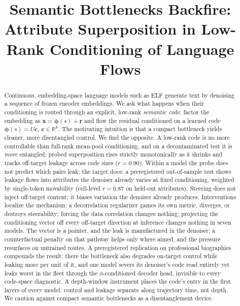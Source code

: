 \documentclass[11pt]{article}
\title{\vspace{-3em}Semantic Bottlenecks Backfire:\\
Attribute Superposition in Low-Rank Conditioning of Language Flows}
\author{}
\date{}
\newcommand{\R}{\mathbb{R}}
\newcommand{\xb}{\bm{x}}
\newcommand{\rb}{\bm{r}}
\newcommand{\phib}{\bm{\phi}}
\newcommand{\cb}{\bm{c}}
\begin{document}
\maketitle
\vspace{-3em}

\begin{abstract}
Continuous, embedding-space language models such as ELF generate text by denoising
a sequence of frozen encoder embeddings. We ask what happens when their
conditioning is routed through an explicit, low-rank \emph{semantic code}: factor
the embedding as $\xb=\phib(s)+\rb$ and flow the residual conditioned on a
learned code $\phib(s)=U\cb$, $\cb\in\R^{k}$. The motivating intuition is that a
compact bottleneck yields cleaner, more disentangled control. We find the
opposite. A low-rank code is no more controllable than full-rank mean-pool
conditioning, and on a decontaminated test it is \emph{more} entangled: probed
superposition rises strictly monotonically as $k$ shrinks and tracks off-target
leakage across code sizes ($r{=}0.90$). Within a model the probe does not
predict which pairs leak; the target does: a preregistered out-of-sample test
shows leakage flows into attributes the denoiser already varies at fixed
conditioning, weighted by single-token movability (cell-level $r{=}0.87$ on
held-out attributes). Steering does not inject off-target content; it biases
variation the denoiser already produces. Interventions localize the mechanism:
a decorrelation regularizer games its own metric, diverges, or destroys
steerability; forcing the data correlation changes nothing; projecting the
conditioning vector off every off-target direction at inference changes
nothing in seven models. The vector is a pointer, and the leak is
manufactured in the denoiser; a counterfactual penalty on that pathway helps
only where aimed, and the pressure resurfaces on untrained routes. A
preregistered replication on professional biographies compounds the result:
there the bottleneck also degrades on-target control while leaking more per
unit of it, and one model severs its denoiser's code read entirely yet leaks
worst in the fleet through the $\phi$-conditioned decoder head, invisible to
every code-space diagnostic. A depth-window instrument places the code's
entry in the first layers of every model: control and leakage separate along
trajectory time, not depth. We caution against compact semantic bottlenecks
as a disentanglement device.
\end{abstract}

\end{document}
